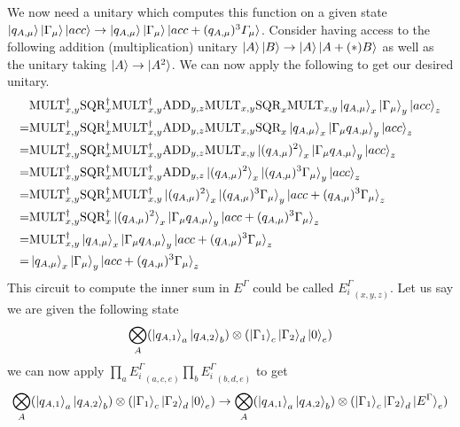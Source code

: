 \documentclass{article}
\begin{document}
We now need a unitary which computes this function on a given state $\ket{q_{A,\mu}}\ket{\Gamma_\mu}\ket{acc} \to \ket{q_{A,\mu}}\ket{\Gamma_\mu}\ket{acc+(q_{A,\mu})^3\varGamma_{\mu}}$. 
Consider having access to the following addition (multiplication) unitary $\ket{A}\ket{B} \to \ket{A}\ket{A+(*)B}$ as well as the unitary taking $\ket{A} \to \ket{A^2}$. 
We can now apply the following to get our desired unitary.  
\begin{align}
    &\text{MULT}^\dagger_{x,y}\text{SQR}^\dagger_x\text{MULT}^\dagger_{x,y}\text{ADD}_{y,z}\text{MULT}_{x,y}\text{SQR}_x\text{MULT}_{x,y}\ket{q_{A,\mu}}_x\ket{\Gamma_\mu}_y\ket{acc}_z\\ 
    = &\text{MULT}^\dagger_{x,y}\text{SQR}^\dagger_x\text{MULT}^\dagger_{x,y}\text{ADD}_{y,z}\text{MULT}_{x,y}\text{SQR}_x\ket{q_{A,\mu}}_x\ket{\Gamma_\mu q_{A,\mu}}_y\ket{acc}_z\\ 
    = &\text{MULT}^\dagger_{x,y}\text{SQR}^\dagger_x\text{MULT}^\dagger_{x,y}\text{ADD}_{y,z}\text{MULT}_{x,y}\ket{(q_{A,\mu})^2}_x\ket{\Gamma_\mu q_{A,\mu}}_y\ket{acc}_z\\ 
    = &\text{MULT}^\dagger_{x,y}\text{SQR}^\dagger_x\text{MULT}^\dagger_{x,y}\text{ADD}_{y,z}\ket{(q_{A,\mu})^2}_x\ket{(q_{A,\mu})^3\Gamma_\mu}_y\ket{acc}_z\\ 
    = &\text{MULT}^\dagger_{x,y}\text{SQR}^\dagger_x\text{MULT}^\dagger_{x,y}\ket{(q_{A,\mu})^2}_x\ket{(q_{A,\mu})^3\Gamma_\mu }_y\ket{acc+(q_{A,\mu})^3\Gamma_\mu}_z\\ 
    = &\text{MULT}^\dagger_{x,y}\text{SQR}^\dagger_x\ket{(q_{A,\mu})^2}_x\ket{\Gamma_\mu q_{A,\mu}}_y\ket{acc+(q_{A,\mu})^3\Gamma_\mu}_z\\ 
    = &\text{MULT}^\dagger_{x,y}\ket{q_{A,\mu}}_x\ket{\Gamma_\mu q_{A,\mu}}_y\ket{acc+(q_{A,\mu})^3\Gamma_\mu}_z\\ 
    = &\ket{q_{A,\mu}}_x\ket{\Gamma_\mu}_y\ket{acc+(q_{A,\mu})^3\Gamma_\mu }_z\\ 
\end{align}
This circuit to compute the inner sum in $E^\Gamma$ could be called ${E_i^\Gamma}_{(x,y,z)}$. Let us say we are given the following state $$\bigotimes_A(\ket{q_{A,1}}_a\ket{q_{A,2}}_b)\otimes(\ket{\Gamma_1}_c\ket{\Gamma_2}_d\ket{0}_e)$$ 
we can now apply $\prod_{a} {E_i^\Gamma}_{(a,c,e)}\prod_{b} {E_i^\Gamma}_{(b,d,e)}$ to get 
$$\bigotimes_A(\ket{q_{A,1}}_a\ket{q_{A,2}}_b)\otimes(\ket{\Gamma_1}_c\ket{\Gamma_2}_d\ket{0}_e) \to \bigotimes_A(\ket{q_{A,1}}_a\ket{q_{A,2}}_b)\otimes(\ket{\Gamma_1}_c\ket{\Gamma_2}_d\ket{E^\Gamma}_e)$$
\end{document}

